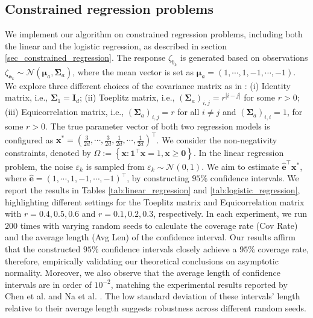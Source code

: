 \documentclass[aos]{imsart}
\numberwithin{equation}{section}
\theoremstyle{plain}
\begin{document}
\subsection{Constrained regression problems}
We implement our algorithm on constrained regression problems, including both the linear and the logistic regression, as described in section \ref{sec_constrained_regression}. The response $\zeta_{b_k}$ is generated based on observations $\zeta_{\bm{a}_k} \sim \mathcal{N}\left(\bm{\mu}_{a}, \bm{\Sigma}_{a} \right)$, where the mean vector is set as $\bm{\mu}_a = (1, \cdots, 1, -1, \cdots, -1)$. We explore three different choices of the covariance matrix as in \cite{chen2020statistical}: (i) Identity matrix, i.e., $\bm{\Sigma}_1 = \bm{I}_d$; (ii) Toeplitz matrix, i.e., $(\bm{\Sigma}_{a})_{i,j} = r^{|i-j|}$ for some $r > 0$; (iii) Equicorrelation matrix, i.e., $(\bm{\Sigma}_{a})_{i,j} = r$ for all $i \neq j$ and $(\bm{\Sigma}_{a})_{i,i} = 1$, for some $r > 0$. The true parameter vector of both two regression models is configured as $\bm{x}^{*} = \left( \frac{3}{2d}, \cdots, \frac{3}{2d}, \frac{1}{2d}, \cdots, \frac{1}{2d}\right)^{\top}$. We consider the non-negativity constraints, denoted by $\Omega := \left\{\bm{x}: \bm{1}^{\top} \bm{x} = 1, \bm{x} \geq \bm{0}\right\}$. In the linear regression problem, the noise $\varepsilon_k$ is sampled from $\varepsilon_k \sim \mathcal{N}(0,1)$. We aim to estimate $\hat{\bm{e}}^{\top} \bm{x}^{*}$, where $\hat{\bm{e}} = \left(1,\cdots, 1, -1, \cdots, -1 \right)^{\top}$, by constructing $95\%$ confidence intervals. We report the results in Tables \ref{tab:linear_regression} and \ref{tab:logistic_regression}, highlighting different settings for the Toeplitz matrix and Equicorrelation matrix with $r = 0.4, 0.5, 0.6$ and $r=0.1, 0.2, 0.3$, respectively. In each experiment, we run $200$ times with varying random seeds to calculate the coverage rate (Cov Rate) and the average length (Avg Len) of the confidence interval.
Our results affirm that the constructed $95\%$ confidence intervals closely achieve a $95\%$ coverage rate, therefore, empirically validating our theoretical conclusions on asymptotic normality.
Moreover, we also observe that the average length of confidence intervals are in order of $10^{-2}$, matching the experimental results reported by Chen et al. \cite{chen2020statistical} and Na et al. \cite{na2022asymptotic}. The low standard deviation of these intervals' length relative to their average length suggests robustness across different random seeds. 
\end{document}
